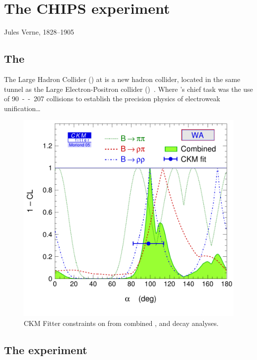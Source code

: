 \chapter{The CHIPS experiment}
\label{chap:chips}

{Jules Verne, 1828--1905}

\section{The \LHC}
The Large Hadron Collider (\LHC) at \CERN is a new hadron collider,
located in the same tunnel as the Large Electron-Positron collider
(\LEP)~\cite{Brianti:2004qq}. Where \LEP's chief task was the use
of \unit{90--207}{\GeV} \epluseminus collisions to establish the
precision physics of electroweak unification\dots

\begin{figure}
  \includegraphics[width=\largefigwidth]{diagrams/3_chips/ckmfitter-alpha-combined}
  \caption[CKM Fitter constraints on \alphaCKM.]%
  {CKM Fitter constraints on \alphaCKM from combined \BToPiPi,
    \BToRhoPi and \BToRhoRho decay analyses.}
  \label{fig:CKMFitter}
\end{figure}

\section{The \LHCb experiment}
\label{sec:LHCbInDetail}

